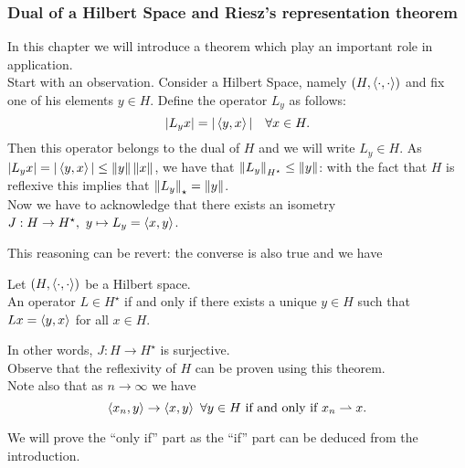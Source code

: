 \subsubsection{Dual of a Hilbert Space and Riesz's representation theorem} 
In this chapter we will introduce a theorem which play an important role in application.\\
Start with an observation. Consider a Hilbert Space, namely $(H, \left\langle\cdot, \cdot\right\rangle)$ and fix one of his elements $y \in H$. Define the operator $L_y$ as follows:
$$|L_yx| = |\left\langle y,x\right\rangle | \quad \forall x \in H.$$
Then this operator belongs to the dual of $H$ and we will write $L_y \in H$. As $|L_yx| = |\left\langle y,x\right\rangle | \leq \left\lVert y\right\rVert \left\lVert x\right\rVert$, we have that $\left\lVert L_y\right\rVert_{H^\star} \leq \left\lVert y\right\rVert$: with the fact that $H$ is reflexive this implies that $\left\lVert L_y\right\rVert_\star = \left\lVert y\right\rVert$.\\
Now we have to acknowledge that there exists an isometry $J : H \to H^\star, \ y \mapsto L_y = \left\langle x, y\right\rangle$.

This reasoning can be revert: the converse is also true and we have

\begin{theo} \label{riesz-repr}
	Let $(H, \left\langle\cdot, \cdot\right\rangle)$ be a Hilbert space.\\
	An operator $L \in H^\star$ if and only if there exists a unique $y \in H$ such that $Lx = \left\langle y, x\right\rangle$ for all $x \in H$.
\end{theo}
In other words, $J: H \to H^\star$ is surjective.\\

Observe that the reflexivity of $H$ can be proven using this theorem.\\
Note also that as $n \to \infty$ we have $$\left\langle x_n,y\right\rangle \to \left\langle x,y\right\rangle \ \forall y \in H \text{ if and only if }x_n \rightharpoonup x.$$

We will prove the ``only if'' part as the ``if'' part can be deduced from the introduction. 

